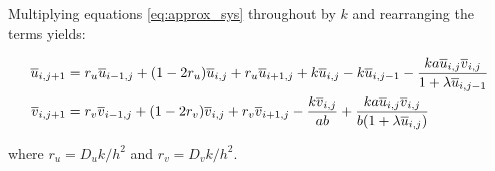 Multiplying equations \eqref{eq:approx_sys} throughout by $k$ and
rearranging the terms yields:

\begin{subequations} \label{eq:rearranged_approx_sys}
\begin{align}
\overline{u}_{i,j+1} &= r_u \overline{u}_{i-1,j} + (1 - 2r_u) \overline{u}_{i,j} + r_u \overline{u}_{i+1,j} +
    k \overline{u}_{i,j} - k \overline{u}_{i,j-1} - \frac{ka\overline{u}_{i,j}\overline{v}_{i,j}}{1+\lambda \overline{u}_{i,j-1}} \label{eq:rearranged_prey}
    \\
\overline{v}_{i,j+1} &= r_v \overline{v}_{i-1,j} + (1 - 2r_v) \overline{v}_{i,j} + r_v \overline{v}_{i+1,j} -
    \frac{k\overline{v}_{i,j}}{ab} + \frac{ka\overline{u}_{i,j}\overline{v}_{i,j}}{b(1+\lambda \overline{u}_{i,j})} \label{eq:rearranged_pred}
\end{align}
\end{subequations}

where $r_u = D_u k / h^2$ and $r_v = D_v k / h^2$.
